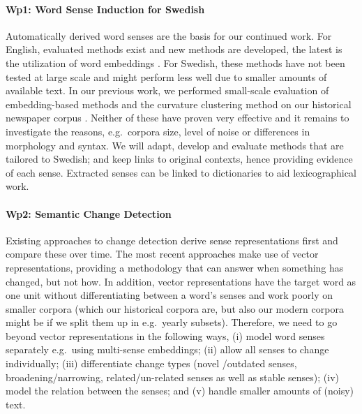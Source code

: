 \documentclass[12pt,twoside,a4paper]{article}
\newcommand\eg{{e.g.\ }}
\begin{document}
	\paragraph{Wp1: Word Sense Induction for Swedish}
	Automatically derived word senses are the basis for our continued work. For English, evaluated methods \citep{pantel:disc, Brody, NovelSenses} exist and new methods are developed, the latest is the utilization of word embeddings \citep{nietopina2015, Sense2Vec, pelevina2016making, Multisense-emb}. For Swedish, these methods have not been tested at large scale and might perform less well due to smaller amounts of available text. %
    	In our previous work, we performed small-scale evaluation of embedding-based methods and the curvature clustering method \citep{Dorow04usingcurvature} on our historical newspaper corpus \cite{Kubhist}. Neither of these have proven very effective and it remains to investigate the reasons, \eg corpora size, level of noise or differences in morphology and syntax. 
	We will adapt, develop and evaluate methods that are tailored to Swedish; and keep links to original contexts, hence providing evidence of each sense. Extracted senses can be linked to dictionaries to aid lexicographical work.    
\vspace{-0.3cm}		
	\paragraph{Wp2: Semantic Change Detection}
	Existing approaches to change detection derive sense representations first and compare these over time. The most recent approaches make use of vector representations, providing a methodology that can answer when something has changed, but not how. In addition, vector representations have the target word as one unit without differentiating between a word’s senses and work poorly on smaller corpora (which our historical corpora are, but also our modern corpora might be if we split them up in \eg yearly subsets). Therefore, we need to go beyond vector representations in the following ways, (i) model word senses separately \eg using multi-sense embeddings; (ii) allow all senses to change individually; (iii) differentiate change types (novel /outdated senses, broadening/narrowing, related/un-related senses as well as stable senses); (iv) model the relation between the senses; and (v) handle smaller amounts of (noisy) text.  
	
\end{document}

